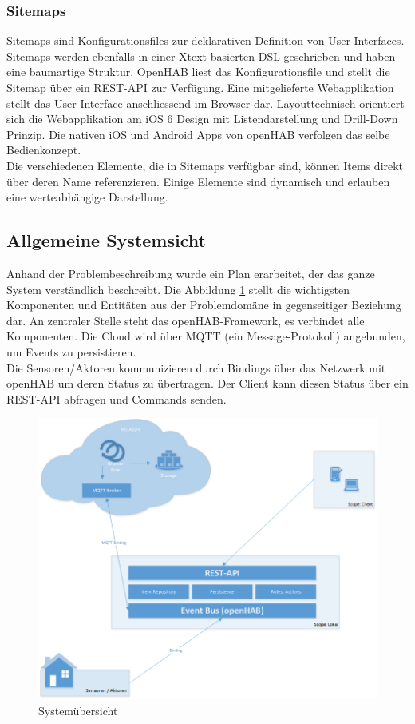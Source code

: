 \subsubsection{Sitemaps}
Sitemaps sind Konfigurationsfiles zur deklarativen Definition von User Interfaces. Sitemaps werden ebenfalls in einer Xtext basierten DSL geschrieben und haben eine baumartige Struktur. OpenHAB liest das Konfigurationsfile und stellt die Sitemap über ein REST-API zur Verfügung. Eine mitgelieferte Webapplikation stellt das User Interface anschliessend im Browser dar. Layouttechnisch orientiert sich die Webapplikation am iOS 6 Design mit Listendarstellung und Drill-Down Prinzip. Die nativen iOS und Android Apps von openHAB verfolgen das selbe Bedienkonzept.\\
Die verschiedenen Elemente, die in Sitemaps verfügbar sind, können Items direkt über deren Name referenzieren. Einige Elemente sind dynamisch und erlauben eine werteabhängige Darstellung.

\subsection{Allgemeine Systemsicht}
Anhand der Problembeschreibung wurde ein Plan erarbeitet, der das ganze System verständlich beschreibt. Die Abbildung \ref{fig:systemView} stellt die wichtigsten Komponenten und Entitäten aus der Problemdomäne in gegenseitiger Beziehung dar. An zentraler Stelle steht das openHAB-Framework, es verbindet alle Komponenten. Die Cloud wird über MQTT (ein Message-Protokoll) angebunden, um Events zu persistieren.\\
Die Sensoren/Aktoren kommunizieren durch Bindings über das Netzwerk mit openHAB um deren Status zu übertragen. Der Client kann diesen Status über ein REST-API abfragen und Commands senden.

\begin{figure}[H]
	\centering
		\includegraphics[scale=0.55]{report/img/systemuebersicht}
	\caption{Systemübersicht}
	\label{fig:systemView}
\end{figure}


